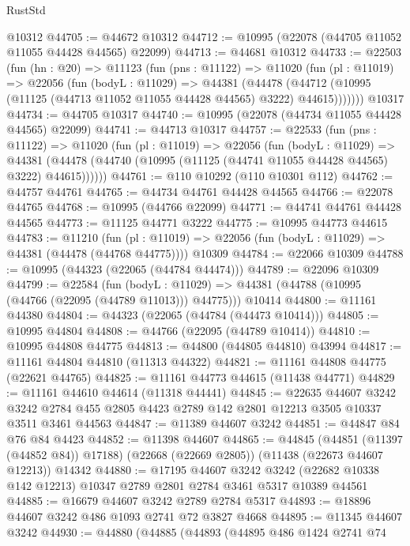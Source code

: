 \begin{lexlean}{RustStd}
\begin{coremodule}
    @10312
@44705 := @44672 @10312
@44712 := @10995 (@22078 (@44705 @11052 @11055 @44428 @44565) @22099)
@44713 := @44681 @10312
@44733 := @22503
    (fun (hn : @20) =>
    @11123
      (fun (pns : @11122) =>
      @11020
        (fun (pl : @11019) =>
        @22056
          (fun (bodyL : @11029) =>
          @44381
            (@44478
              (@44712 (@10995 (@11125 (@44713 @11052 @11055 @44428 @44565) @3222) @44615)))))))
    @10317
@44734 := @44705 @10317
@44740 := @10995 (@22078 (@44734 @11055 @44428 @44565) @22099)
@44741 := @44713 @10317
@44757 := @22533
    (fun (pns : @11122) =>
    @11020
      (fun (pl : @11019) =>
      @22056
        (fun (bodyL : @11029) =>
        @44381 (@44478 (@44740 (@10995 (@11125 (@44741 @11055 @44428 @44565) @3222) @44615))))))
@44761 := @110 @10292 (@110 @10301 @112)
@44762 := @44757 @44761
@44765 := @44734 @44761 @44428 @44565
@44766 := @22078 @44765
@44768 := @10995 (@44766 @22099)
@44771 := @44741 @44761 @44428 @44565
@44773 := @11125 @44771 @3222
@44775 := @10995 @44773 @44615
@44783 := @11210
    (fun (pl : @11019) => @22056 (fun (bodyL : @11029) => @44381 (@44478 (@44768 @44775))))
    @10309
@44784 := @22066 @10309
@44788 := @10995 (@44323 (@22065 (@44784 @44474)))
@44789 := @22096 @10309
@44799 := @22584
    (fun (bodyL : @11029) => @44381 (@44788 (@10995 (@44766 (@22095 (@44789 @11013))) @44775)))
    @10414
@44800 := @11161 @44380
@44804 := @44323 (@22065 (@44784 (@44473 @10414)))
@44805 := @10995 @44804
@44808 := @44766 (@22095 (@44789 @10414))
@44810 := @10995 @44808 @44775
@44813 := @44800 (@44805 @44810) @43994
@44817 := @11161 @44804 @44810 (@11313 @44322)
@44821 := @11161 @44808 @44775 (@22621 @44765)
@44825 := @11161 @44773 @44615 (@11438 @44771)
@44829 := @11161 @44610 @44614 (@11318 @44441)
@44845 := @22635
    @44607
    @3242
    @3242
    @2784
    @455
    @2805
    @4423
    @2789
    @142
    @2801
    @12213
    @3505
    @10337
    @3511
    @3461
    @44563
@44847 := @11389 @44607 @3242
@44851 := @44847 @84 @76 @84 @4423
@44852 := @11398 @44607
@44865 := @44845
    (@44851 (@11397 (@44852 @84)) @17188)
    (@22668 (@22669 @2805))
    (@11438 (@22673 @44607 @12213))
    @14342
@44880 := @17195
    @44607
    @3242
    @3242
    (@22682 @10338 @142 @12213)
    @10347
    @2789
    @2801
    @2784
    @3461
    @5317
    @10389
    @44561
@44885 := @16679 @44607 @3242 @2789 @2784 @5317
@44893 := @18896 @44607 @3242 @486 @1093 @2741 @72 @3827 @4668
@44895 := @11345 @44607 @3242
@44930 := @44880
    (@44885
      (@44893
        (@44895
          @486
          @1424
          @2741
          @74

\end{coremodule}
\end{lexlean}
